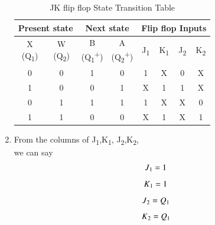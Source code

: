 \documentclass[journal,12pt,twocolumn]{IEEEtran}
\begin{document}
\begin{enumerate}[1.]
\begin{table}[h!] 
	\begin{center}
		\begin{tabular}{ |c|c|c|c|c|c|c|c| } 
			\hline
			\multicolumn{2}{|c|}{Present state} &\multicolumn{2}{|c|}{Next state} & \multicolumn{4}{|c|}{Flip flop Inputs}  \\
			\hline
			\thead{X \\ (Q\textsubscript{1})} & \thead{W \\(Q\textsubscript{2})} & \thead{B \\(Q\textsubscript{1}\textsuperscript{+})} & \thead{A \\ (Q\textsubscript{2}\textsuperscript{+})} & J\textsubscript{1} & K\textsubscript{1} & J\textsubscript{2} & K\textsubscript{2}  \\ 
			\hline
			0 & 0 & 1 & 0 & 1 & X & 0 & X  \\ 
			\hline
			1 & 0 & 0 & 1 & X & 1 & 1 & X  \\ 
			\hline
			0 & 1 & 1 & 1 & 1 & X & X & 0  \\ 
			\hline
			1 & 1 & 0 & 0 & X & 1 & X & 1  \\
			\hline
		\end{tabular}
		\caption{JK flip flop State Transition Table}
		\label{table:JK_table}
	\end{center}
\end{table}

\item From the columns of J\textsubscript{1},K\textsubscript{1}, J\textsubscript{2},K\textsubscript{2}, \\
we can say \\
\begin{equation} \label{eq:1}
	J\textsubscript{1} = 1
\end{equation}
\begin{equation} \label{eq:2}
	K\textsubscript{1} = 1 
\end{equation}
\begin{equation} \label{eq:3}
	J\textsubscript{2} = Q\textsubscript{1}
\end{equation}
\begin{equation} \label{eq:4}
	K\textsubscript{2} = Q\textsubscript{1}
\end{equation}
%
\end{enumerate}
\end{document}
